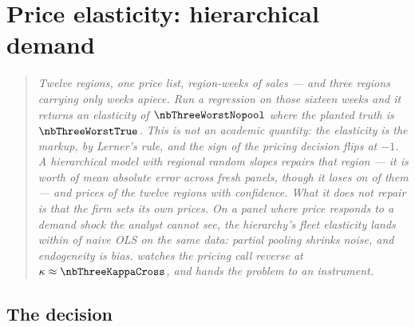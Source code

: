%
\chapter{Price elasticity: hierarchical demand}
\label{ch:pe}

\begin{quote}\small
\emph{Twelve regions, one price list, \nbThreeNObs{} region-weeks of sales --- and three regions
carrying only \nbThreeObsMin{} weeks apiece. Run a regression on those sixteen weeks and it
returns an elasticity of $\nbThreeWorstNopool$ where the planted truth is $\nbThreeWorstTrue$.
This is not an academic quantity: the elasticity \emph{is} the markup, by Lerner's rule, and the
sign of the pricing decision flips at $-1$. A hierarchical model with regional random slopes
repairs that region --- it is worth \pc{\nbThreeGainMean} of mean absolute error across
\nbThreeNseed{} fresh panels, though it \emph{loses} on \nbThreeNLosses{} of them --- and prices
\nbThreeNSet{} of the twelve regions with confidence. What it does not repair is that the firm
sets its own prices. On a panel where price responds to a demand shock the analyst cannot see,
the hierarchy's fleet elasticity lands within \nbThreeHierVsOls{} of naive OLS on the same data:
partial pooling shrinks noise, and endogeneity is bias.  watches the pricing
call reverse at $\kappa \approx \nbThreeKappaCross$, and hands the problem to an instrument.}
\end{quote}

\section{The decision}
\label{sec:pe:decision}

